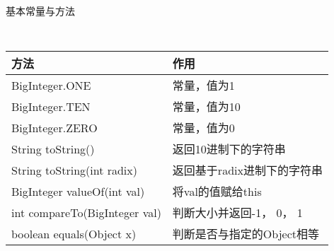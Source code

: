 基本常量与方法
{\tt
    \begin{longtable}{|p{9.3cm}|p{6cm}|}
    \hline
    方法 & 作用 \\
    \hline
    BigInteger.ONE & 常量，值为1 \\
    \hline
    BigInteger.TEN & 常量，值为10 \\
    \hline
    BigInteger.ZERO & 常量，值为0 \\
    \hline
    String toString() & 返回10进制下的字符串 \\
    \hline
    String toString(int radix) & 返回基于radix进制下的字符串 \\
    \hline
    BigInteger valueOf(int val) & 将val的值赋给this \\
    \hline
    int compareTo(BigInteger val) & 判断大小并返回-1， 0， 1 \\
    \hline
    boolean equals(Object x) & 判断是否与指定的Object相等 \\
    \hline
    \end{longtable}
}

